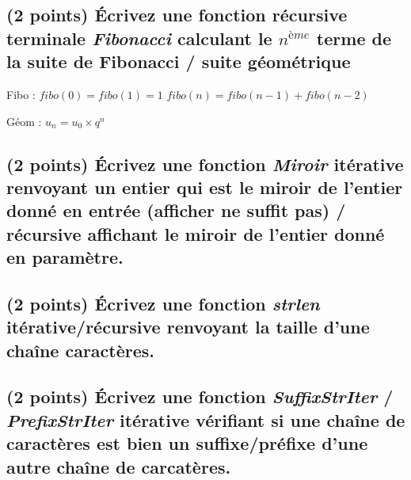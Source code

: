 \documentclass[11pt,a4paper]{article}
\begin{document}
\bigskip

\subsection{(2 points) \'Ecrivez une fonction récursive terminale \og \textit{Fibonacci} \fg{} calculant le $n^{ème}$ terme de la suite de Fibonacci / suite géométrique }

Fibo :
$ fibo(0) = fibo(1) = 1 $
$ fibo(n) = fibo(n − 1) + fibo(n − 2) $


Géom :
$ u_{n} = u_{0} × q^{n} $

\bigskip

\begin{center}
\end{center}




\subsection{(2 points) \'Ecrivez une fonction \og \textit{Miroir} \fg{} itérative renvoyant un entier qui est le miroir de l'entier donné en entrée (afficher ne suffit pas) / récursive affichant le miroir de l'entier donné en paramètre. }

\bigskip

\begin{center}
\end{center}

\bigskip

\subsection{(2 points) \'Ecrivez une fonction \og \textit{strlen} \fg{} itérative/récursive renvoyant la taille d'une chaîne caractères. }

\bigskip

\begin{center}
\end{center}

\bigskip

\subsection{(2 points) \'Ecrivez une fonction \og \textit{SuffixStrIter} \fg{} / \og \textit{PrefixStrIter} \fg{} itérative vérifiant si une chaîne de caractères est bien un suffixe/préfixe d'une autre chaîne de carcatères. }
\end{document}
